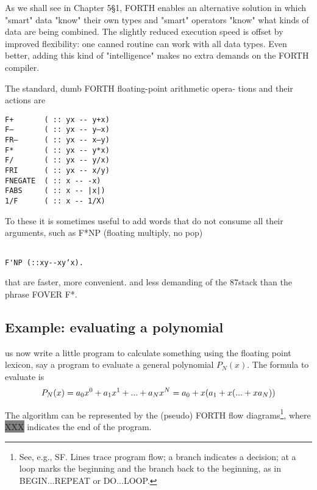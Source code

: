 As we shall see in Chapter 5§1, FORTH enables an alternative
solution in which "smart" data "know" their own types and
"smart" operators "know" what kinds of data are being combined.
The slightly reduced execution speed is offset by improved
ﬂexibility: one canned routine can work with all data types. Even
better, adding this kind of "intelligence" makes no extra demands
on the FORTH compiler.

The standard, dumb FORTH floating-point arithmetic opera-
tions and their actions are

\begin{verbatim}
F+       ( :: yx -- y+x)
F—       ( :: yx -- y—x)
FR—      ( :: yx -- x—y)
F*       ( :: yx -- y*x)
F/       ( :: yx -- y/x)
FRI      ( :: yx -- x/y)
FNEGATE  ( :: x -- -x)
FABS     ( :: x -- |x|)
1/F      ( :: x -- 1/X)
\end{verbatim}

To these it is sometimes useful to add words that do not consume
all their arguments, such as F*NP (floating multiply, no pop)

\begin{verbatim}

F'NP (::xy--xy‘x).

\end{verbatim}

that are faster, more convenient. and less demanding of the
87stack than the phrase FOVER F*.

\subsection{Example: evaluating a polynomial}
 us now write a little program to calculate something using
the floating point lexicon, say a program to evaluate a general
polynomial $P_N (x)$. The formula to evaluate is
\begin{equation}
P_N(x)=a_0x^0+a_1x^1+...+a_Nx^N
\\
=a_0+x(a_1+x(... +xa_N))
\end{equation}



The algorithm can be represented by the (pseudo) FORTH ﬂow
diagrams\footnote{See, e.g., SF. Lines trace program flow; a branch indicates a
decision; at a loop \otimes marks the beginning and \bullet  the branch back to
the beginning, as in BEGIN...REPEAT or DO...LOOP.}, where
{\colorbox{gray}{\color{gray}XXX}} indicates the end of the program.

 

